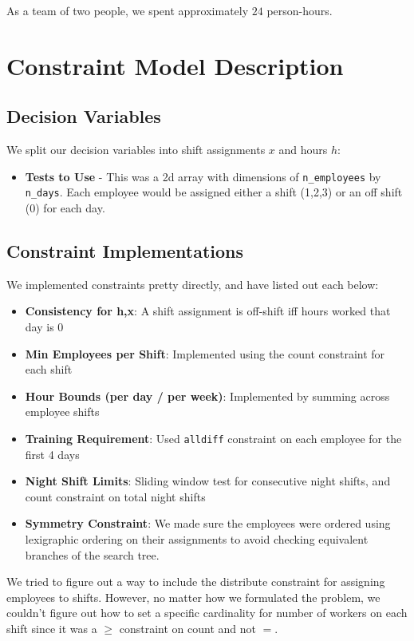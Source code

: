 \documentclass[11pt]{article}
\begin{document}
As a team of two people, we spent approximately $24$ person-hours.
\vspace{-10pt}
\section*{Constraint Model Description}
\label{sec:intro}
\subsection*{Decision Variables}
We split our decision variables into shift assignments $x$ and hours $h$:
\begin{itemize}
    \item \textbf{Tests to Use} - This was a 2d array with dimensions of \texttt{n\_employees} 
        by \texttt{n\_days}. Each employee would be assigned either a shift (1,2,3) or an off shift (0)
        for each day.
\end{itemize}

\subsection*{Constraint Implementations}

We implemented constraints pretty directly, and have listed out each below:
\begin{itemize}
    \item \textbf{Consistency for h,x}: A shift assignment is off-shift iff hours worked that day is $0$
    \item \textbf{Min Employees per Shift}: Implemented using the count constraint for each shift
    \item \textbf{Hour Bounds (per day / per week)}: Implemented by summing across employee shifts
    \item \textbf{Training Requirement}: Used \texttt{alldiff} constraint on each employee for the first 4 days
    \item \textbf{Night Shift Limits}: Sliding window test for consecutive night shifts, and count constraint on total night shifts
    \item \textbf{Symmetry Constraint}: We made sure the employees were ordered using lexigraphic ordering on their assignments to avoid checking equivalent branches of the search tree.
\end{itemize}

We tried to figure out a way to include the distribute constraint for assigning
employees to shifts. However, no matter how we formulated the problem,
we couldn't figure out how to set a specific cardinality for number of workers on each
shift since it was a $\geq$ constraint on count and not $=$.
\end{document}
